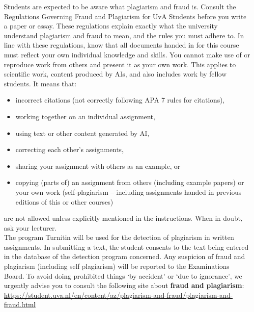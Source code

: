 \documentclass[a4paper,10pt,twocolumn]{report}
\begin{document}
Students are expected to be aware what plagiarism and fraud is. Consult the Regulations Governing Fraud and Plagiarism for UvA Students before you write a paper or essay. These regulations explain exactly what the university understand plagiarism and fraud to mean, and the rules you must adhere to.  In line with these regulations, know that all documents handed in for this course must reflect your own individual knowledge and skills. You cannot make use of or reproduce work from others and present it as your own work. This applies to scientific work, content produced by AIs, and also includes work by fellow students.  
It means that:  
	\begin{itemize}
	\item incorrect citations (not correctly following APA 7 rules for citations), 
	\item working together on an individual assignment,
	\item using text or other content generated by AI,
	\item correcting each other’s assignments, 
	\item sharing your assignment with others as an example, or 
	\item copying (parts of) an assignment from others (including example papers) or your own work (self-plagiarism – including assignments handed in previous editions of this or other courses)
\end{itemize}
are not allowed unless explicitly mentioned in the instructions. When in doubt, ask your lecturer. \\

 The program Turnitin will be used for the detection of plagiarism in written assignments. In submitting a text, the student consents to the text being entered in the database of the detection program concerned. Any suspicion of fraud and plagiarism (including self plagiarism) will be reported to the Examinations Board. To avoid doing prohibited things ‘by accident’ or ‘due to ignorance’, we urgently advise you to consult the following site about \textbf{fraud and plagiarism}: \url{https://student.uva.nl/en/content/az/plagiarism-and-fraud/plagiarism-and-fraud.html}
\end{document}
